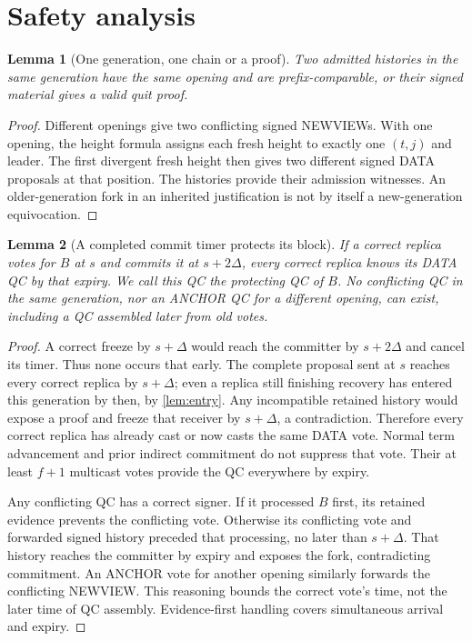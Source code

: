\documentclass[11pt,a4paper]{article}
\newtheorem{lemma}[lemma]{Lemma}
\begin{document}
\section{Safety analysis}
\label{sec:safety}
\begin{lemma}[One generation, one chain or a proof]
\label{lem:fork}
Two admitted histories in the same generation have the same opening and
are prefix-comparable, or their signed material gives a valid quit proof.
\end{lemma}
\begin{proof}
Different openings give two conflicting signed NEWVIEWs. With one opening,
the height formula assigns each fresh height to exactly one $(t,j)$ and
leader. The first divergent fresh height then gives two different signed
DATA proposals at that position. The histories provide their admission
witnesses. An older-generation fork in an inherited justification is not
by itself a new-generation equivocation.
\end{proof}

\begin{lemma}[A completed commit timer protects its block]
\label{lem:timer}
If a correct replica votes for $B$ at $s$ and commits it at $s+2\Delta$,
every correct replica knows its DATA QC by that expiry. We call this
QC the \emph{protecting QC} of $B$. No conflicting
QC in the same generation, nor an ANCHOR QC for a different opening,
can exist, including a QC assembled later from old votes.
\end{lemma}
\begin{proof}
A correct freeze by $s+\Delta$ would reach the committer by $s+2\Delta$
and cancel its timer. Thus none occurs that early. The complete proposal
sent at $s$ reaches every correct replica by $s+\Delta$; even a replica
still finishing recovery has entered this generation by then, by
\cref{lem:entry}. Any incompatible retained history would expose a proof
and freeze that receiver by $s+\Delta$, a contradiction. Therefore every
correct replica has already cast or now casts the same DATA vote. Normal
term advancement and prior indirect commitment do not suppress that vote.
Their at least $f+1$ multicast votes provide the QC everywhere by expiry.

Any conflicting QC has a correct signer. If it processed $B$ first, its
retained evidence prevents the conflicting vote. Otherwise its conflicting
vote and forwarded signed history preceded that processing, no later
than $s+\Delta$. That history reaches the committer by expiry and exposes
the fork, contradicting commitment. An ANCHOR vote for another opening
similarly forwards the conflicting NEWVIEW. This reasoning bounds the
correct vote's time, not the later time of QC assembly. Evidence-first
handling covers simultaneous arrival and expiry.
\end{proof}
\end{document}
